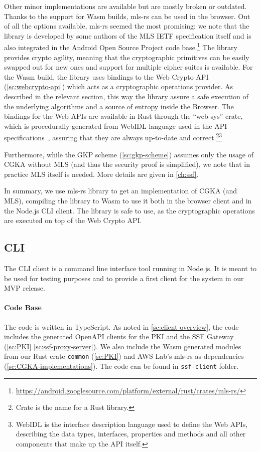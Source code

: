 Other minor implementations are available but are mostly broken or outdated.
Thanks to the support for Wasm builds, mls-rs can be used in the browser.
Out of all the options available, mls-rs seemed the most promising:
we note that the library is developed by some authors of the MLS IETF
specification itself and is also integrated in the Android Open Source Project
code base.\footnote{\url{https://android.googlesource.com/platform/external/rust/crates/mls-rs/}}
The library provides crypto agility, meaning that the cryptographic
primitives can be easily swapped out for new ones and support for multiple cipher suites is available.
For the Wasm build, the library uses bindings to the Web Crypto API 
(\cref{sc:webcrypto-api}) which acts as a cryptographic operations provider.
As described in the relevant section, 
this way the library assure a safe execution of the underlying
algorithms and a source of entropy inside the Browser. 
The bindings for the Web APIs are available in Rust 
through the ``web-sys'' crate,
which is procedurally generated from WebIDL language
used in the API specifications~\cite{WebSys}, assuring
that they are always up-to-date and correct.\footnote{Crate is the name for a Rust library.}\footnote{WebIDL is the interface description language used to define the Web APIs, describing the data types, interfaces, properties and methods and all other components that make up the API itself.} 

Furthermore, while the GKP scheme (\cref{sc:gkp-scheme})
assumes only the usage of CGKA without MLS (and thus the security proof
is simplified), we note that in practice MLS itself is needed.
More details are given in \cref{ch:ssf}.

In summary, we use mls-rs library to get an implementation
of CGKA (and MLS), compiling the library to Wasm to use it both
in the browser client and in the Node.js CLI client. The library is
safe to use, as the cryptographic operations are executed on top of the Web Crypto API.


\subsection{CLI}\label{CLI}

The CLI client is a command line interface tool running in Node.js.
It is meant to be used for testing purposes and to provide a
first client for the system in our MVP release.


\paragraph{Code Base} 
The code is written in TypeScript. 
As noted in \cref{sc:client-overview}, the code includes the
generated OpenAPI clients for the PKI and the SSF Gateway
(\cref{sc:PKI} \cref{sc:ssf-proxy-server}).
We also include the Wasm generated modules 
from our Rust crate \texttt{common} (\cref{sc:PKI}) 
and AWS Lab's mls-rs as dependencies
(\cref{sc:CGKA-implementations}).
The code can be found in \texttt{ssf-client} folder.

